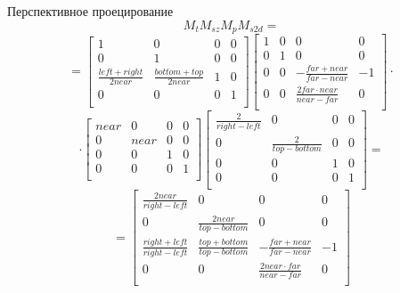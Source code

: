\documentclass{beamer}
\begin{document}
	\begin{frame}{Перспективное проецирование}
		\[
			M_t M_{sz} M_p M_{s2d} =
		\]
		\vspace{-0.5cm}
		\[
			=
			\begin{bmatrix}
				1 & 0 & 0 & 0 \\
				0 & 1 & 0 & 0 \\
				\frac{left + right}{2 near} & \frac{bottom + top}{2 near} & 1 & 0 \\
				0 & 0 & 0 & 1 \\
			\end{bmatrix}	
			\begin{bmatrix}
				1 & 0 & 0 & 0 \\
				0 & 1 & 0 & 0 \\
				0 & 0 & - \frac{far + near}{far - near} & -1 \\
				0 & 0 & \frac{2 far \cdot near} {near - far} & 0 \\
			\end{bmatrix}	
			\cdot
			\]
			\vspace{-0.2cm}
			\[
				\cdot
			\begin{bmatrix}
				near & 0 & 0 & 0 \\
				0 & near & 0 & 0 \\
				0 & 0 & 1 & 0 \\
				0 & 0 & 0 & 1 \\
			\end{bmatrix}	
			\begin{bmatrix}
				\frac{2}{right - left} & 0 & 0 & 0 \\
				0 & \frac{2}{top - bottom} & 0 & 0 \\
				0 & 0 & 1 & 0 \\
				0 & 0 & 0 & 1 \\
			\end{bmatrix}	
			=
		\]
		\vspace{-0.2cm}
		\[
			=
			\begin{bmatrix}
				\frac{2 near}{right - left} & 0 & 0 & 0 \\
				0 & \frac{2 near}{top - bottom} & 0 & 0 \\
				\frac{right + left}{right - left} & \frac{top + bottom}{top - bottom} & -\frac{far + near}{far - near} & -1 \\
				0 & 0 & \frac{2 near \cdot far}{near - far} & 0 \\
			\end{bmatrix}		
		\]
		


\end{frame}
\end{document}
